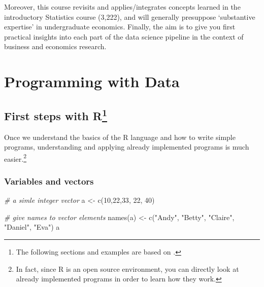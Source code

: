\documentclass[
  12pt,
]{style/krantz}
\newenvironment{Shaded}{\begin{snugshade}}{\end{snugshade}}
\newcommand{\CommentTok}[1]{\textcolor[rgb]{0.56,0.35,0.01}{\textit{#1}}}
\newcommand{\DecValTok}[1]{\textcolor[rgb]{0.00,0.00,0.81}{#1}}
\newcommand{\FunctionTok}[1]{\textcolor[rgb]{0.00,0.00,0.00}{#1}}
\newcommand{\NormalTok}[1]{#1}
\newcommand{\OtherTok}[1]{\textcolor[rgb]{0.56,0.35,0.01}{#1}}
\newcommand{\StringTok}[1]{\textcolor[rgb]{0.31,0.60,0.02}{#1}}
\begin{document}
Moreover, this course revisits and applies/integrates concepts learned in the introductory Statistics course (3,222), and will generally presuppose `substantive expertise' in undergraduate economics. Finally, the aim is to give you first practical insights into each part of the data science pipeline in the context of business and economics research.

\hypertarget{programming-with-data}{%
\chapter{Programming with Data}\label{programming-with-data}}

\hypertarget{first-steps-with-r}{%
\section[First steps with R]{\texorpdfstring{First steps with R\footnote{The following sections and examples are based on \citet{umatter_2018}.}}{First steps with R}}\label{first-steps-with-r}}

Once we understand the basics of the R language and how to write simple programs, understanding and applying already implemented programs is much easier.\footnote{In fact, since R is an open source environment, you can directly look at already implemented programs in order to learn how they work.}

\hypertarget{variables-and-vectors}{%
\subsection{Variables and vectors}\label{variables-and-vectors}}

\begin{Shaded}
\begin{Highlighting}[]
\CommentTok{\# a simle integer vector}
\NormalTok{a }\OtherTok{\textless{}{-}} \FunctionTok{c}\NormalTok{(}\DecValTok{10}\NormalTok{,}\DecValTok{22}\NormalTok{,}\DecValTok{33}\NormalTok{, }\DecValTok{22}\NormalTok{, }\DecValTok{40}\NormalTok{)}

\CommentTok{\# give names to vector elements}
\FunctionTok{names}\NormalTok{(a) }\OtherTok{\textless{}{-}} \FunctionTok{c}\NormalTok{(}\StringTok{"Andy"}\NormalTok{, }\StringTok{"Betty"}\NormalTok{, }\StringTok{"Claire"}\NormalTok{, }\StringTok{"Daniel"}\NormalTok{, }\StringTok{"Eva"}\NormalTok{)}
\NormalTok{a}
\end{Highlighting}
\end{Shaded}
\end{document}
